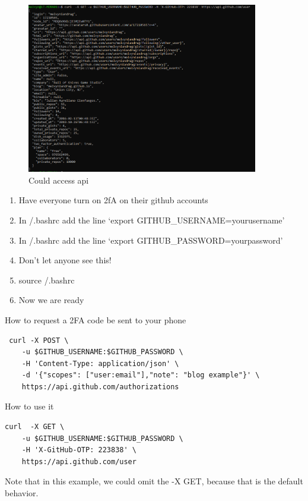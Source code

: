 \documentclass[10pt]{article}
\begin{document}
\begin{figure}[h]
  \centering
    \includegraphics[width=0.9\textwidth]{successfulGithubAPIHit.png}
  \caption{Could access api}
\end{figure}


\begin{enumerate}
\item Have everyone turn on 2fA on their github accounts
\item In \texttildelow/.bashrc add the line `export GITHUB\_USERNAME=yourusername'
\item In \texttildelow/.bashrc add the line `export GITHUB\_PASSWORD=yourpassword'
\item Don't let anyone see this!
\item source \texttildelow/.bashrc
\item Now we are ready
\end{enumerate}

How to request a 2FA code be sent to your phone
\begin{lstlisting}
 curl -X POST \
	-u $GITHUB_USERNAME:$GITHUB_PASSWORD \
	-H 'Content-Type: application/json' \
	-d '{"scopes": ["user:email"],"note": "blog example"}' \
	https://api.github.com/authorizations
\end{lstlisting}

How to use it
\begin{lstlisting}
curl  -X GET \
	-u $GITHUB_USERNAME:$GITHUB_PASSWORD \
	-H 'X-GitHub-OTP: 223838' \
	https://api.github.com/user
\end{lstlisting}


Note that in this example, we could omit the -X GET, because that is the default behavior.
\end{document}
